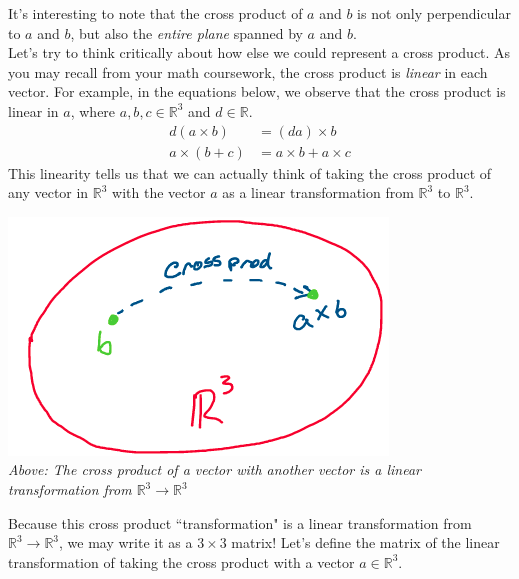 \documentclass[oneside]{book}
\begin{document}
It's interesting to note that the cross product of $a$ and $b$ is not only perpendicular to $a$ and $b$, but also the \textit{entire plane} spanned by $a$ and $b$.\\
Let's try to think critically about how else we could represent a cross product. As you may recall from your math coursework, the cross product is \textit{linear} in each vector. For example, in the equations below, we observe that the cross product is linear in $a$, where $a, b, c \in \mathbb{R}^3$ and $d \in \mathbb{R}$.
\begin{align}
    d(a \times b) &= (da)\times b\\
    a \times (b + c) &= a \times b + a \times c
\end{align}
This linearity tells us that we can actually think of taking the cross product of any vector in $\mathbb{R}^3$ with the vector $a$ as a linear transformation from $\mathbb{R}^3$ to $\mathbb{R}^3$.
\begin{center}
    \includegraphics[scale=0.5]{images/lincross.png}\\
    \textit{Above: The cross product of a vector with another vector is a linear transformation from $\mathbb{R}^3\to \mathbb{R}^3$}
\end{center}
Because this cross product ``transformation" is a linear transformation from $\mathbb{R}^3\to \mathbb{R}^3$, we may write it as a $3\times 3$ matrix! Let's define the matrix of the linear transformation of taking the cross product with a vector $a \in \mathbb{R}^3$.
\end{document}
